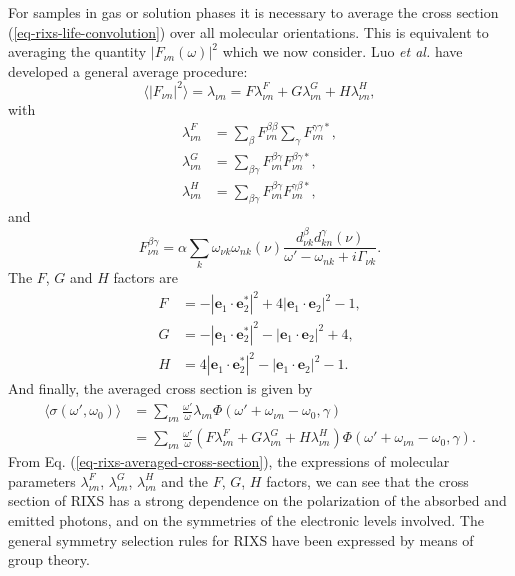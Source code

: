 \documentclass[a4paper,11pt,twoside,openright]{book}
\begin{document}
For samples in gas or solution phases it is necessary to average the cross section (\ref{eq-rixs-life-convolution})
over all molecular orientations. This is equivalent to averaging the quantity $|F_{\nu n}(\omega)|^2$ which
we now consider. Luo \textit{et al.}\cite{Luo-JPB27-4169,Luo-PRB52-14479} have developed a general average procedure:
\begin{equation}
  \langle|F_{\nu n}|^2\rangle
    =\lambda_{\nu n}=F\lambda^{F}_{\nu n}+G\lambda^{G}_{\nu n}+H\lambda^{H}_{\nu n},
\end{equation}
with
\begin{align}
  \lambda^{F}_{\nu n}&=\displaystyle\sum_{\beta}F^{\beta\beta}_{\nu n}\sum_{\gamma}F^{\gamma\gamma*}_{\nu n},\\
  \lambda^{G}_{\nu n}&=\displaystyle\sum_{\beta\gamma}F^{\beta\gamma}_{\nu n}F^{\beta\gamma*}_{\nu n},\\
  \lambda^{H}_{\nu n}&=\displaystyle\sum_{\beta\gamma}F^{\beta\gamma}_{\nu n}F^{\gamma\beta*}_{\nu n},
\end{align}
and
\begin{equation}
  F^{\beta\gamma}_{\nu n}
  =\alpha\sum_{k}\omega_{\nu k}\omega_{nk}(\nu)%
    \frac{d^{\beta}_{\nu k}d^{\gamma}_{kn}(\nu)}{\omega'-\omega_{nk}+i\Gamma_{\nu k}}.
\end{equation}
The $F$, $G$ and $H$ factors are
\begin{align}
  F&=-|\mathbf{e}_1\cdot\mathbf{e}_2^*|^2+4|\mathbf{e}_1\cdot\mathbf{e}_2|^2-1,\\
  G&=-|\mathbf{e}_1\cdot\mathbf{e}_2^*|^2-|\mathbf{e}_1\cdot\mathbf{e}_2|^2+4,\\
  H&=4|\mathbf{e}_1\cdot\mathbf{e}_2^*|^2-|\mathbf{e}_1\cdot\mathbf{e}_2|^2-1.
\end{align}
And finally, the averaged cross section is given by\cite{Luo-JPB27-4169,Luo-PRB52-14479}
\begin{align}
  \label{eq-rixs-averaged-cross-section}
  \langle\sigma(\omega',\omega_0)\rangle
  &=\sum_{\nu n}\frac{\omega'}{\omega}\lambda_{\nu n}\Phi(\omega'+\omega_{\nu n}-\omega_0,\gamma)\\
  &=\sum_{\nu n}\frac{\omega'}{\omega}(F\lambda^{F}_{\nu n}+G\lambda^{G}_{\nu n}+H\lambda^{H}_{\nu n})%
    \Phi(\omega'+\omega_{\nu n}-\omega_0,\gamma).\nonumber
\end{align}
From Eq. (\ref{eq-rixs-averaged-cross-section}), the expressions of molecular parameters $\lambda^{F}_{\nu n}$,
$\lambda^{G}_{\nu n}$, $\lambda^{H}_{\nu n}$ and the $F$, $G$, $H$ factors, we can see
that the cross section of RIXS has a strong dependence on the polarization of the absorbed
and emitted photons, and on the symmetries of the electronic levels involved. The general
symmetry selection rules for RIXS have been expressed by means of group theory\cite{Luo-JPB27-4169,Luo-PRB52-14479}.
\end{document}
